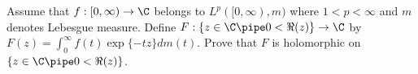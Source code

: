 Assume that $f:[0,\infty)\rightarrow \C$ belongs to
$L^p([0,\infty),m)$ where $1<p<\infty$ and $m$ denotes Lebesgue
measure. Define $F:\{z\in \C \pipe 0<\Re(z)\}\rightarrow \C$ by
$F(z)=\int_0^{\infty}f(t)\exp \{-tz\} dm(t)$. Prove that $F$ is
holomorphic on $\{z\in \C \pipe 0<\Re(z)\}$.
